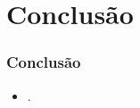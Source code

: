 

\section{Conclusão}
\begin{frame}
    \frametitle{Conclusão}
    \begin{itemize}
    \item .
    \end{itemize}
\end{frame}

